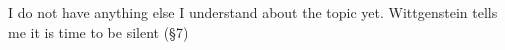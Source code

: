 \documentclass[12pt]{apa}
\begin{document}
I do not have anything else I understand about the topic yet. Wittgenstein tells me it is time to be silent (\S 7)










\clearpage

{}

\printindex[autx]
\end{document}
